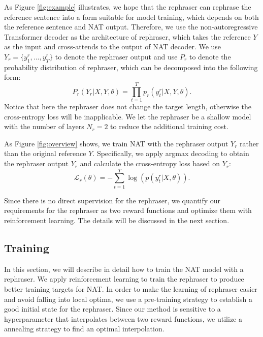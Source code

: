 \documentclass[letterpaper]{article} %
\begin{document}
As Figure \ref{fig:example} illustrates, we hope that the rephraser can rephrase the reference sentence into a form suitable for model training, which depends on both the reference sentence and NAT output. Therefore, we use the non-autoregressive Transformer decoder as the architecture of rephraser, which takes the reference $Y$ as the input and cross-attends to the output of NAT decoder. We use $Y_r=\{y_1^r,...,y_T^r\}$ to denote the rephraser output and use $P_r$ to denote the probability distribution of rephraser, which can be decomposed into the following form: 
\begin{equation}
 P_r(Y_r|X,Y,\theta) = \prod_{t=1}^{T}p_r(y_t^r|X,Y,\theta).
\end{equation}
Notice that here the rephraser does not change the target length, otherwise the cross-entropy loss will be inapplicable. We let the rephraser be a shallow model with the number of layers $N_r=2$ to reduce the additional training cost.

As Figure \ref{fig:overview} shows, we train NAT with the rephraser output $Y_r$ rather than the original reference $Y$. Specifically, we apply argmax decoding to obtain the rephraser output $Y_r$ and calculate the cross-entropy loss based on $Y_r$:
\begin{equation}
\mathcal{L}_{r}(\theta) = -\sum_{t=1}^{T}\log(p(y_t^r|X,\theta)).
\end{equation}

Since there is no direct supervision for the rephraser, we quantify our requirements for the rephraser as two reward functions and optimize them with reinforcement learning. The details will be discussed in the next section. 

\subsection{Training}
\label{sec:32}
In this section, we will describe in detail how to train the NAT model with a rephraser. We apply reinforcement learning to train the rephraser to produce better training targets for NAT. In order to make the learning of rephraser easier and avoid falling into local optima, we use a pre-training strategy to establish a good initial state for the rephraser. Since our method is sensitive to a hyperparameter that interpolates between two reward functions, we utilize a annealing strategy to find an optimal interpolation.
\end{document}
